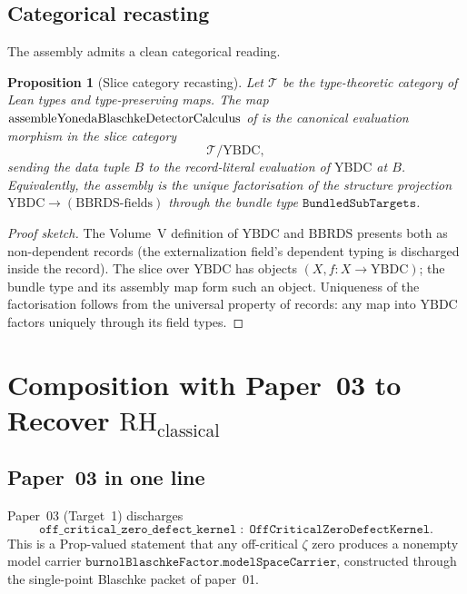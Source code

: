 \documentclass[12pt]{article}
\theoremstyle{plain}
\newtheorem{proposition}[theorem]{Proposition}
\theoremstyle{definition}
\theoremstyle{remark}
\newcommand{\YBDC}{\mathrm{YBDC}}
\newcommand{\BBRDS}{\mathrm{BBRDS}}
\begin{document}
\subsection{Categorical recasting}

The assembly admits a clean categorical reading.

\begin{proposition}[Slice category recasting]
\label{prop:slice-category-recast}
Let \(\mathcal{T}\) be the type-theoretic category of Lean types and
type-preserving maps. The map
\(\mathrm{assembleYoneda\-Blaschke\-Detector\-Calculus}\) of
 is the canonical evaluation morphism in the slice
category
\[
  \mathcal{T} / \YBDC,
\]
sending the data tuple \(B\) to the record-literal evaluation of
\(\YBDC\) at \(B\). Equivalently, the assembly is the unique
factorisation of the structure projection
\(\YBDC \to (\BBRDS \text{-fields})\) through the bundle type
\(\mathtt{BundledSubTargets}\).
\end{proposition}

\begin{proof}[Proof sketch]
The Volume~V definition of \(\YBDC\) and \(\BBRDS\) presents both as
non-dependent records (the externalization field's dependent typing is
discharged inside the record). The slice over \(\YBDC\) has objects
\((X, f : X \to \YBDC)\); the bundle type and its assembly map form
such an object. Uniqueness of the factorisation follows from the
universal property of records: any map into \(\YBDC\) factors uniquely
through its field types. \qedhere
\end{proof}

\section{Composition with Paper~03 to Recover \texorpdfstring{$\mathrm{RH}_{\mathrm{classical}}$}{RH classical}}
\label{sec:rh-classical}

\subsection{Paper~03 in one line}

Paper~03 (Target~1) discharges
\begin{equation}
  \label{eq:paper03}
  \mathtt{off\_critical\_zero\_defect\_kernel}
   \;:\; \mathtt{OffCriticalZeroDefectKernel}.
\end{equation}
This is a \(\mathrm{Prop}\)-valued statement that any off-critical
\(\zeta\) zero produces a nonempty model carrier
\(\mathtt{burnolBlaschkeFactor.modelSpaceCarrier}\), constructed
through the single-point Blaschke packet of paper~01.
\end{document}
